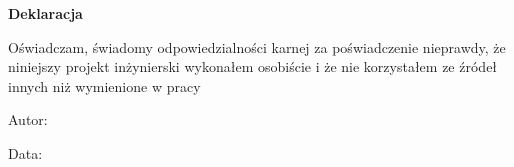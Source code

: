 \newpage
{}
\begin{center}
	\fontsize{14}{16}\selectfont  
	\textbf{Deklaracja}  
\end{center}
\justify
{}
\setlength{\parindent}{0pt}
\fontsize{12}{14}\selectfont
Oświadczam, świadomy odpowiedzialności karnej za poświadczenie
nieprawdy, że niniejszy projekt inżynierski wykonałem osobiście i że nie
korzystałem ze źródeł innych niż wymienione w pracy

\vspace{1 cm}
Autor: 

\vspace{0.5 cm}
Data: \\ 
